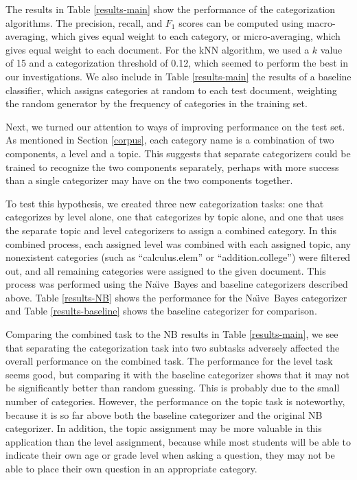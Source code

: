 \documentclass{article}
\newcommand{\naive}{Na\"\i ve}
\begin{document}
The results in Table \ref{results-main} show the performance of the
categorization algorithms.  The precision, recall, and $F_1$ scores
can be computed using macro-averaging, which gives equal weight to
each category, or micro-averaging, which gives equal weight to each
document. \cite{yang:99, sebastiani:02} For the kNN algorithm, we used
a $k$ value of 15 and a categorization threshold of 0.12, which seemed
to perform the best in our investigations.  We also include in Table
\ref{results-main} the results of a baseline classifier, which assigns categories at
random to each test document, weighting the random generator by the
frequency of categories in the training set.

Next, we turned our attention to ways of improving performance on the
test set.  As mentioned in Section \ref{corpus}, each category name is
a combination of two components, a level and a topic.  This suggests
that separate categorizers could be trained to recognize the two
components separately, perhaps with more success than a single
categorizer may have on the two components together.

To test this hypothesis, we created three new categorization tasks:
one that categorizes by level alone, one that categorizes by topic
alone, and one that uses the separate topic and level categorizers to
assign a combined category.  In this combined process, each assigned
level was combined with each assigned topic, any nonexistent
categories (such as ``calculus.elem'' or ``addition.college'') were
filtered out, and all remaining categories were assigned to the given
document.  This process was performed using the \naive\ Bayes and
baseline categorizers described above.  Table \ref{results-NB} shows
the performance for the \naive\ Bayes categorizer and Table
\ref{results-baseline} shows the baseline categorizer for comparison.

Comparing the combined task to the NB results in Table
\ref{results-main}, we see that separating the categorization task
into two subtasks adversely affected the overall performance on the combined task.
The performance for the level task seems good, but comparing it with the baseline
categorizer shows that it may not be significantly better than random
guessing.  This is probably due to the small number of categories.
However, the performance on the topic task is noteworthy,
because it is so far above both the baseline categorizer and the
original NB categorizer.  In addition, the topic assignment may be
more valuable in this application than the level assignment, because while most students
will be able to indicate their own age or grade level when asking a
question, they may not be able to place their own question in an
appropriate category.
\end{document}
